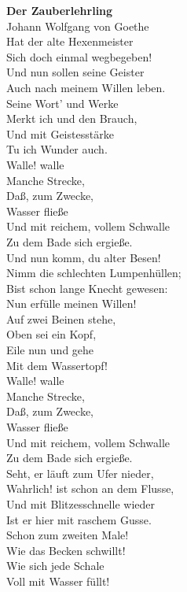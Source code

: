 { 				
		{\large \textbf{Der Zauberlehrling} \\
		Johann Wolfgang von Goethe} \\
		
		Hat der alte Hexenmeister \\
		Sich doch einmal wegbegeben!  \\
		Und nun sollen seine Geister \\
		Auch nach meinem Willen leben. \\
		Seine Wort' und Werke \\
		Merkt ich und den Brauch, \\ 
		Und mit Geistesstärke \\
		Tu ich Wunder auch. \\
		
		Walle! walle \\
		Manche Strecke, \\ 
		Daß, zum Zwecke, \\
		Wasser fließe \\
		Und mit reichem, vollem Schwalle \\
		Zu dem Bade sich ergieße. \\
	
		Und nun komm, du alter Besen! \\ 
		Nimm die schlechten Lumpenhüllen; \\ 
		Bist schon lange Knecht gewesen: \\
		Nun erfülle meinen Willen! \\
		Auf zwei Beinen stehe, \\
		Oben sei ein Kopf, \\
		Eile nun und gehe \\
		Mit dem Wassertopf! \\
		
		Walle! walle \\
		Manche Strecke, \\ 
		Daß, zum Zwecke, \\
		Wasser fließe \\
		Und mit reichem, vollem Schwalle \\
		Zu dem Bade sich ergieße. \\
		
		Seht, er läuft zum Ufer nieder, \\
		Wahrlich! ist schon an dem Flusse, \\
		Und mit Blitzesschnelle wieder \\
		Ist er hier mit raschem Gusse. \\
		Schon zum zweiten Male! \\
		Wie das Becken schwillt! \\
		Wie sich jede Schale \\
		Voll mit Wasser füllt! \\
		
}
